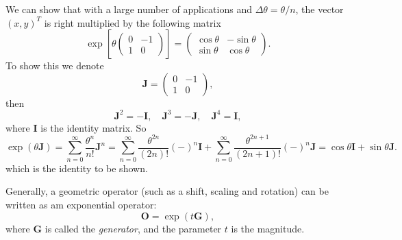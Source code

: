 \documentclass{article}
\begin{document}
%
We can show that with a large number of applications
and $\Delta \theta = \theta / n$,
the vector $(x, y)^T$ is right multiplied by the following matrix
$$
\exp\left[
  \theta
\left(
  \begin{array}{ccc}
    0 & -1 \\
    1 & 0
  \end{array}
\right)\right]
=
\left(
  \begin{array}{ccc}
    \cos \theta & -\sin \theta \\
    \sin \theta & \cos \theta
  \end{array}
\right).
$$
To show this we denote
$$
\mathbf J
=
\left(
  \begin{array}{ccc}
    0 & -1 \\
    1 & 0
  \end{array}
\right),
$$
then
$$
\mathbf J^2 = -\mathbf I, \quad
\mathbf J^3 = -\mathbf J, \quad
\mathbf J^4 = \mathbf I,
$$
where $\mathbf I$ is the identity matrix.
So
$$
\exp(\theta \mathbf J)
=
\sum_{n = 0}^\infty \frac{\theta^n}{n!} \mathbf J^n
=
\sum_{n = 0}^\infty \frac{\theta^{2n}}{(2n)!} (-)^n \mathbf I
+
\sum_{n = 0}^\infty \frac{\theta^{2n+1}}{(2n+1)!} (-)^n \mathbf J
=
\cos\theta \mathbf I
+
\sin \theta \mathbf J.
$$
which is the identity to be shown.

Generally, a geometric operator (such as a shift, scaling and rotation)
can be written as am exponential operator:
$$
\mathbf O = \exp(t \mathbf G),
$$
where $\mathbf G$ is called the \emph{generator},
and the parameter $t$ is the magnitude.


\end{document}
